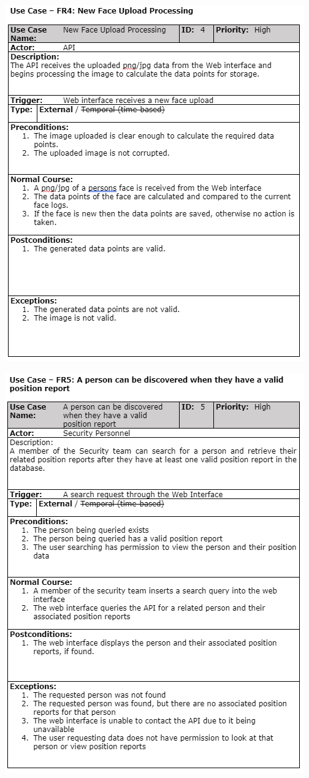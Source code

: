 \documentclass[
  english,
  a4paper,
,tablecaptionabove
]{scrartcl}
\begin{document}
\includegraphics{images/ppm-images/use-case-4.png} \newpage

\includegraphics{images/ppm-images/use-case-5.png} \newpage
\end{document}
